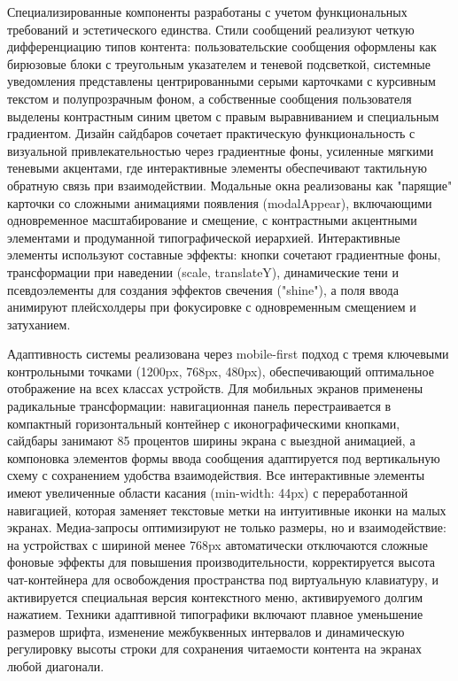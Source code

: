 Специализированные компоненты разработаны с учетом функциональных требований и эстетического единства. Стили сообщений реализуют четкую дифференциацию типов контента: пользовательские сообщения оформлены как бирюзовые блоки с треугольным указателем и теневой подсветкой, системные уведомления представлены центрированными серыми карточками с курсивным текстом и полупрозрачным фоном, а собственные сообщения пользователя выделены контрастным синим цветом с правым выравниванием и специальным градиентом. Дизайн сайдбаров сочетает практическую функциональность с визуальной привлекательностью через градиентные фоны, усиленные мягкими теневыми акцентами, где интерактивные элементы обеспечивают тактильную обратную связь при взаимодействии. Модальные окна реализованы как "парящие" карточки со сложными анимациями появления (modalAppear), включающими одновременное масштабирование и смещение, с контрастными акцентными элементами и продуманной типографической иерархией. Интерактивные элементы используют составные эффекты: кнопки сочетают градиентные фоны, трансформации при наведении (scale, translateY), динамические тени и псевдоэлементы для создания эффектов свечения ("shine"), а поля ввода анимируют плейсхолдеры при фокусировке с одновременным смещением и затуханием.

Адаптивность системы реализована через mobile-first подход с тремя ключевыми контрольными точками (1200px, 768px, 480px), обеспечивающий оптимальное отображение на всех классах устройств. Для мобильных экранов применены радикальные трансформации: навигационная панель перестраивается в компактный горизонтальный контейнер с иконографическими кнопками, сайдбары занимают 85 процентов ширины экрана с выездной анимацией, а компоновка элементов формы ввода сообщения адаптируется под вертикальную схему с сохранением удобства взаимодействия. Все интерактивные элементы имеют увеличенные области касания (min-width: 44px) с переработанной навигацией, которая заменяет текстовые метки на интуитивные иконки на малых экранах. Медиа-запросы оптимизируют не только размеры, но и взаимодействие: на устройствах с шириной менее 768px автоматически отключаются сложные фоновые эффекты для повышения производительности, корректируется высота чат-контейнера для освобождения пространства под виртуальную клавиатуру, и активируется специальная версия контекстного меню, активируемого долгим нажатием. Техники адаптивной типографики включают плавное уменьшение размеров шрифта, изменение межбуквенных интервалов и динамическую регулировку высоты строки для сохранения читаемости контента на экранах любой диагонали.

